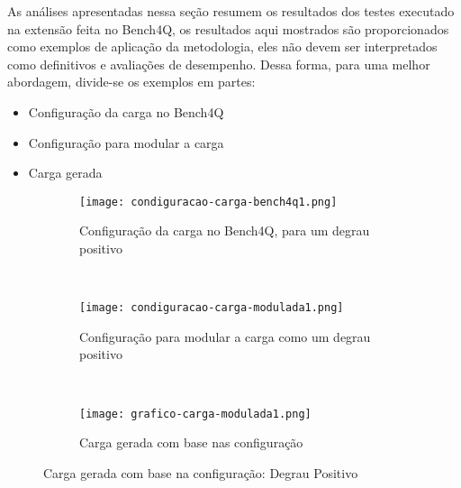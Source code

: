 As análises apresentadas nessa seção resumem os resultados dos testes executado na extensão feita no Bench4Q, os resultados aqui mostrados são proporcionados como exemplos de aplicação da metodologia, eles não devem ser interpretados como definitivos e avaliações de desempenho. Dessa forma, para uma melhor abordagem, divide-se os exemplos em  partes:
\begin{itemize}
	\item Configuração da carga no Bench4Q
	\item Configuração para modular a carga
	\item Carga gerada
\end{itemize}

\begin{figure}[!htb]
	\begin{subfigure}{\linewidth}
		\centering
		\texttt{[image: condiguracao-carga-bench4q1.png]}
		\caption{Configuração da carga no Bench4Q, para um degrau positivo}
		\label{fig:condiguracao-carga-bench4q1}
	\end{subfigure}\\
	\begin{subfigure}{\linewidth}
		\centering
		\texttt{[image: condiguracao-carga-modulada1.png]}
		\caption{Configuração para modular a carga como um degrau positivo}
		\label{fig:condiguracao-carga-modulada1}
	\end{subfigure}\\[1ex]
	\begin{subfigure}{\linewidth}
		\centering
		\texttt{[image: grafico-carga-modulada1.png]}
		\caption{Carga gerada com base nas configuração}
		\label{fig:grafico-carga-modulada1}
	\end{subfigure}
	\caption{Carga gerada com base na configuração: Degrau Positivo}
	\label{fig:carga-modulada1}
	\fautor
\end{figure}

